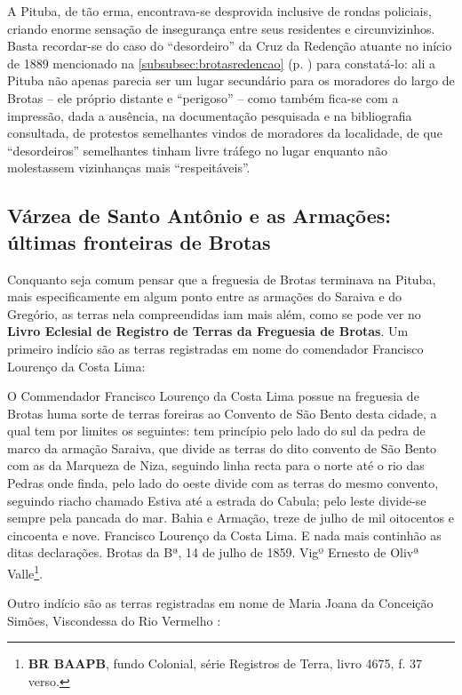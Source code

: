 A Pituba, de tão erma, encontrava-se desprovida inclusive de rondas policiais, criando enorme sensação de insegurança entre seus residentes e circunvizinhos. Basta recordar-se do caso do ``desordeiro'' da Cruz da Redenção atuante no início de 1889 mencionado na \autoref{subsubsec:brotasredencao} (p. \pageref{subsubsec:brotasredencao}) para constatá-lo: ali a Pituba não apenas parecia ser um lugar secundário para os moradores do largo de Brotas -- ele próprio distante e ``perigoso'' -- como também fica-se com a impressão, dada a ausência, na documentação pesquisada e na bibliografia consultada, de protestos semelhantes vindos de moradores da localidade, de que ``desordeiros'' semelhantes tinham livre tráfego no lugar enquanto não molestassem vizinhanças mais ``respeitáveis''.

\subsection{Várzea de Santo Antônio e as Armações: últimas fronteiras de Brotas}

Conquanto seja comum pensar que a freguesia de Brotas terminava na Pituba, mais especificamente em algum ponto entre as armações do Saraiva e do Gregório, as terras nela compreendidas iam mais além, como se pode ver no \textbf{Livro Eclesial de Registro de Terras da Freguesia de Brotas}. Um primeiro indício são as terras registradas em nome do comendador Francisco Lourenço da Costa Lima:

\begin{citacao}
O Commendador Francisco Lourenço da Costa Lima possue na freguesia de Brotas huma sorte de terras foreiras ao Convento de São Bento desta cidade, a qual tem por limites os seguintes: tem princípio pelo lado do sul da pedra de marco da armação Saraiva, que divide as terras do dito convento de São Bento com as da Marqueza de Niza, seguindo linha recta para o norte até o rio das Pedras onde finda, pelo lado do oeste divide com as terras do mesmo convento, seguindo riacho chamado Estiva até a estrada do Cabula; pelo leste divide-se sempre pela pancada do mar. Bahia e Armação, treze de julho de mil oitocentos e cincoenta e nove. Francisco Lourenço da Costa Lima. E nada mais continhão as ditas declarações. Brotas da Bª, 14 de julho de 1859. Vigº Ernesto de Olivª Valle\footnote{\textbf{BR BAAPB}, fundo Colonial, série Registros de Terra, livro 4675, f. 37 verso.}.
\end{citacao}

Outro indício são as terras registradas em nome de Maria Joana da Conceição Simões, Viscondessa do Rio Vermelho \cite[p.~693]{zuquete_nobreza_1989}:

